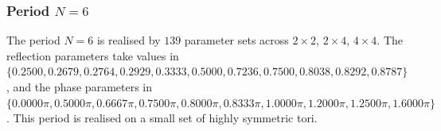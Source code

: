 \par
\subsubsection{Period $N = 6$}
The period $N=6$ is realised by $139$ parameter sets across $2\times2$, $2\times4$, $4\times4$. The reflection parameters take values in $\{0.2500, 0.2679, 0.2764, 0.2929, 0.3333, 0.5000, 0.7236, 0.7500, 0.8038, 0.8292, 0.8787\}$, and the phase parameters in $\{0.0000\pi, 0.5000\pi, 0.6667\pi, 0.7500\pi, 0.8000\pi, 0.8333\pi, 1.0000\pi, 1.2000\pi, 1.2500\pi, 1.6000\pi\}$. This period is realised on a small set of highly symmetric
tori.
